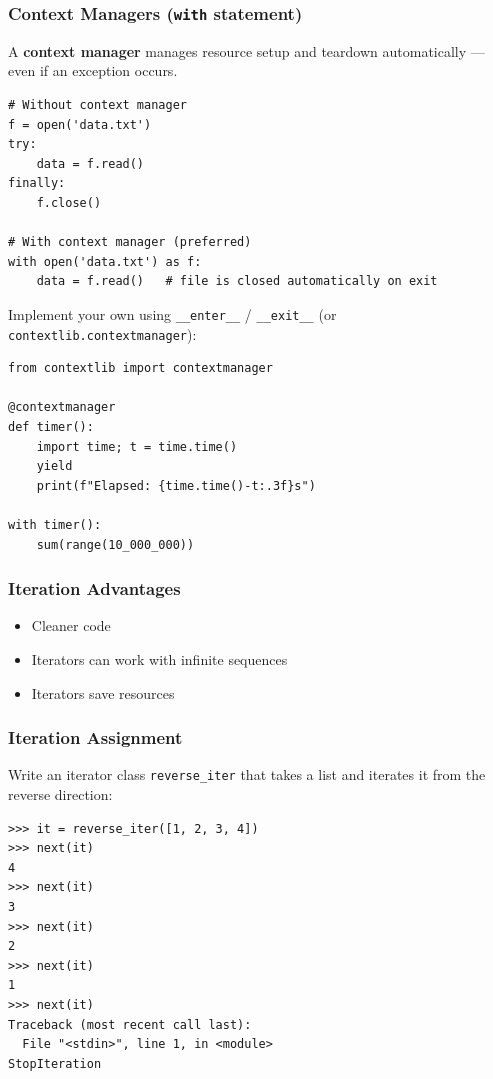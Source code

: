 \begin{frame}[fragile]\frametitle{Context Managers (\texttt{with} statement)}
A \textbf{context manager} manages resource setup and teardown automatically --- even if an exception occurs.
\begin{lstlisting}
# Without context manager
f = open('data.txt')
try:
    data = f.read()
finally:
    f.close()

# With context manager (preferred)
with open('data.txt') as f:
    data = f.read()   # file is closed automatically on exit
\end{lstlisting}
Implement your own using \lstinline|__enter__| / \lstinline|__exit__| (or \lstinline|contextlib.contextmanager|):
\begin{lstlisting}
from contextlib import contextmanager

@contextmanager
def timer():
    import time; t = time.time()
    yield
    print(f"Elapsed: {time.time()-t:.3f}s")

with timer():
    sum(range(10_000_000))
\end{lstlisting}
\end{frame}

\begin{frame}[fragile]\frametitle{Iteration Advantages}
    \begin{itemize}
    \item Cleaner code
    \item     Iterators can work with infinite sequences
    \item     Iterators save resources
    \end{itemize}
   \end{frame}
   
\begin{frame}[fragile]\frametitle{Iteration Assignment}
Write an iterator class \lstinline|reverse_iter| that takes a list and iterates it from the reverse direction:
\begin{lstlisting}
>>> it = reverse_iter([1, 2, 3, 4])
>>> next(it)
4
>>> next(it)
3
>>> next(it)
2
>>> next(it)
1
>>> next(it)
Traceback (most recent call last):
  File "<stdin>", line 1, in <module>
StopIteration
\end{lstlisting}
\end{frame}

